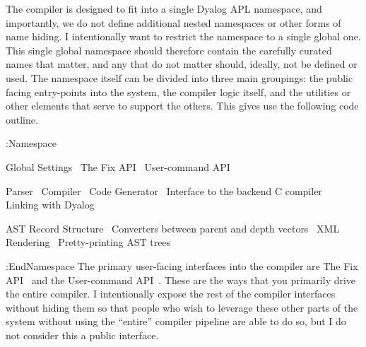 \documentclass{article}%
\begin{document}
The compiler is designed to fit into a single Dyalog APL namespace,
and importantly, we do not define additional nested namespaces or 
other forms of name hiding. 
I intentionally want to restrict the namespace to a single global one.
This single global namespace should therefore contain the carefully 
curated names that matter, and any that do not matter should, ideally,
not be defined or used.
The namespace itself can be divided into three main groupings:
the public facing entry-points into the system,
the compiler logic itself,
and the utilities or other elements that serve to support the others.
This gives use the following code outline.

\nwenddocs{}\endmoddef\nwstartdeflinemarkup\nwenddeflinemarkup
:Namespace 

        \LA{}Global Settings~{\nwtagstyle{}}\RA{}
        \LA{}The Fix API~{\nwtagstyle{}}\RA{}
        \LA{}User-command API~{\nwtagstyle{}}\RA{}

        \LA{}Parser~{\nwtagstyle{}}\RA{}
        \LA{}Compiler~{\nwtagstyle{}}\RA{}
        \LA{}Code Generator~{\nwtagstyle{}}\RA{}
        \LA{}Interface to the backend C compiler~{\nwtagstyle{}}\RA{}
        \LA{}Linking with Dyalog~{\nwtagstyle{}}\RA{}

        \LA{}AST Record Structure~{\nwtagstyle{}}\RA{}
        \LA{}Converters between parent and depth vectors~{\nwtagstyle{}}\RA{}
        \LA{}XML Rendering~{\nwtagstyle{}}\RA{}
        \LA{}Pretty-printing AST trees~{\nwtagstyle{}}\RA{}

:EndNamespace
\eatline
\nwnotused{*}\nwendcode{}\nwdocspar
The primary user-facing interfaces into the compiler are 
{\Tt{}\LA{}The Fix API~{\nwtagstyle{}}\RA{}\nwendquote} and the {\Tt{}\LA{}User-command API~{\nwtagstyle{}}\RA{}\nwendquote}. 
These are the ways that you primarily drive the entire compiler.
I intentionally expose the rest of the compiler interfaces
without hiding them so that people who wish to leverage these 
other parts of the system without using the ``entire'' compiler 
pipeline are able to do so, but I do not consider this a public
interface.
\end{document}

